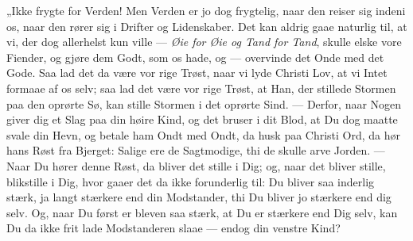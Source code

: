 \documentclass[12pt,a4paper]{book}
\begin{document}
„Ikke frygte for Verden! Men Verden er jo dog frygtelig, naar den reiser sig indeni os,
naar den rører sig i Drifter og Lidenskaber. Det kan aldrig gaae naturlig til, at vi, der
dog allerhelst kun ville --- \emph{Øie for Øie og Tand for Tand}, skulle elske vore
Fiender, og gjøre dem Godt, som os hade, og --- overvinde det Onde med det Gode. Saa lad
det da være vor rige Trøst, naar vi lyde Christi Lov, at vi Intet formaae af os selv; saa
lad det være vor rige Trøst, at Han, der stillede Stormen paa den oprørte Sø, kan stille
Stormen i det oprørte Sind. --- Derfor, naar Nogen giver dig et Slag paa din høire Kind, og
det bruser i dit Blod, at Du dog maatte svale din Hevn, og betale
ham Ondt med Ondt, da husk paa Christi Ord, da hør hans
Røst fra Bjerget: {\large Salige ere de Sagtmodige, thi de skulle arve Jorden.}
--- Naar Du hører denne Røst, da bliver det stille i Dig; og, naar det bliver
stille, blikstille i Dig, hvor gaaer det da ikke forunderlig til: Du bliver saa
inderlig stærk, ja langt stærkere end din Modstander, thi Du bliver jo stærkere
end dig selv. Og, naar Du først er bleven saa stærk, at Du er stærkere end Dig
selv, kan Du da ikke frit lade Modstanderen slaae --- endog din venstre Kind?
\end{document}
